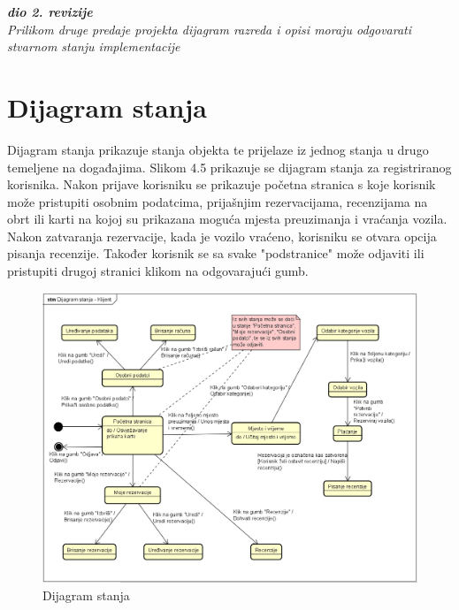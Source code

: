 			\textbf{\textit{dio 2. revizije}}\\			
			
			\textit{Prilikom druge predaje projekta dijagram razreda i opisi moraju odgovarati stvarnom stanju implementacije}
			
			
			
			\eject
		
		\section{Dijagram stanja}
			
			
			\noindent Dijagram stanja prikazuje stanja objekta te prijelaze iz jednog stanja u drugo temeljene na događajima. Slikom 4.5 prikazuje se dijagram stanja za registriranog korisnika. Nakon prijave korisniku se prikazuje početna stranica s koje korisnik može pristupiti osobnim podatcima, prijašnjim rezervacijama, recenzijama na obrt ili karti na kojoj su prikazana moguća mjesta preuzimanja i vraćanja vozila. Nakon zatvaranja rezervacije, kada je vozilo vraćeno, korisniku se otvara opcija pisanja recenzije. Također korisnik se sa svake "podstranice" može odjaviti ili pristupiti drugoj stranici klikom na odgovarajući gumb.
			
			
			\begin{figure}[hp]
                    \centering
                    \includegraphics[width=15cm]{slike/Dijagram stanja.png}
                    \caption{Dijagram stanja}
                    \label{fig:useCase-2}
                \end{figure}
			\eject 
		
